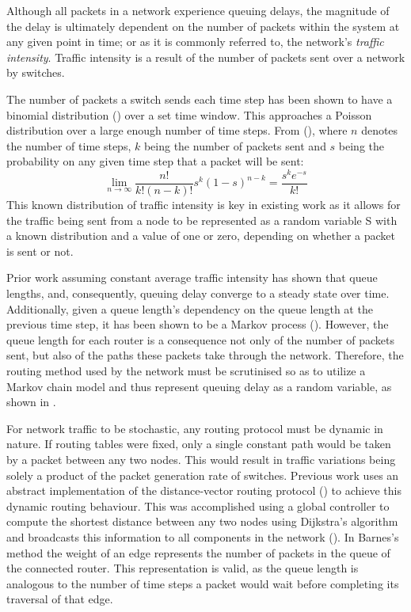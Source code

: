 Although all packets in a network experience queuing delays, the magnitude of the delay is ultimately dependent on the number of packets within the system at any given point in time; or as it is commonly referred to, the network's \textit{traffic intensity}. Traffic intensity is a result of the number of packets sent over a network by switches.\par
The number of packets a switch sends each time step has been shown to have a binomial distribution (\cite{barnes_stochastic_2020}) over a set time window. This approaches a Poisson distribution over a large enough number of time steps. From (\cite{barnes_stochastic_2020}), where $n$ denotes the number of time steps, $k$ being the number of packets sent and $s$ being the probability on any given time step that a packet will be sent:
\[\lim_{n\to\infty} \frac{n!}{k!(n-k)!}s^k (1-s)^{n-k} =\frac{s^k e^{-s}}{k!}\]
This known distribution of traffic intensity is key in existing work as it allows for the traffic being sent from a node to be represented as a random variable S with a known distribution and a value of one or zero, depending on whether a packet is sent or not.\par
Prior work assuming constant average traffic intensity has shown that queue lengths, and, consequently, queuing delay converge to a steady state over time. Additionally, given a queue length's dependency on the queue length at the previous time step, it has been shown to be a Markov process (\cite{barnes_stochastic_2020}). However, the queue length for each router is a consequence not only of the number of packets sent, but also of the paths these packets take through the network. Therefore, the routing method used by the network must be scrutinised so as to utilize a Markov chain model and thus represent queuing delay as a random variable, as shown in \cite{barnes_stochastic_2020}.\par
For network traffic to be stochastic, any routing protocol must be dynamic in nature. If routing tables were fixed, only a single constant path would be taken by a packet between any two nodes. This would result in traffic variations being solely a product of the packet generation rate of switches. Previous work uses an abstract implementation of the distance-vector routing protocol (\cite{perkins_ad_2003}) to achieve this dynamic routing behaviour. This was accomplished using a global controller to compute the shortest distance between any two nodes using Dijkstra's algorithm and broadcasts this information to all components in the network (\cite{barnes_stochastic_2020}). In Barnes's method the weight of an edge represents the number of packets in the queue of the connected router. This representation is valid, as the queue length is analogous to the number of time steps a packet would wait before completing its traversal of that edge.\par
